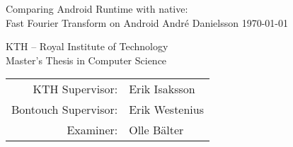\documentclass[12pt,a4paper,openright,parskip,final,twoside,en]{csee_msc_thesis} %
\newif\ifrelease
\begin{document}
\def\thesistitle{\Large Comparing Android Runtime with native:\\ Fast Fourier Transform on Android}
\def\theauthor{\large André Danielsson}
\def\theaddress{
    KTH -- Royal Institute of Technology\\
    \vspace{3mm}
    Master's Thesis in Computer Science\\
    \vspace{3cm}
    \begin{tabular}{rl}
        KTH Supervisor: & Erik Isaksson\\
        Bontouch Supervisor: & Erik Westenius\\
        Examiner: & Olle Bälter
    \end{tabular}
}
\def\theabstract{}
\def\thedate{\today}
\def\thepreface{}
\def\thesweabstract{}

\startpreamble
  {\thesistitle}
  {\theauthor}
  {\thedate}
  {\theabstract}
  {\thepreface}
  {\theaddress}
  {\thesweabstract}















\fancyhead[LO]{}%
\fancyhead[RE]{}%
\fancyhead[LE]{\thepage}%
\fancyhead[RO]{\thepage}




\ifrelease
\appendix

\makeappendix{Appendix A}{Source code\label{appendix:code}}


\makeappendix{Appendix B}{Results\label{appendix:results}}

\fi
\end{document}
